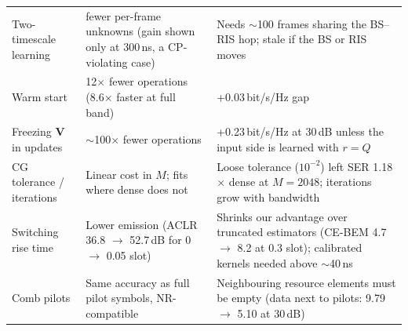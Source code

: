 \begin{table}[!htbp]
{\begin{tabular}{p{3.6cm}p{6.2cm}p{6.6cm}}
Two-timescale learning & fewer per-frame unknowns (gain shown only at 300\,ns, a CP-violating case) & Needs $\sim$100 frames sharing the BS--RIS hop; stale if the BS or RIS moves \\
Warm start & 12$\times$ fewer operations (8.6$\times$ faster at full band) & +0.03\,bit/s/Hz gap \\
Freezing $\bm V$ in updates & $\sim$100$\times$ fewer operations & +0.23\,bit/s/Hz at 30\,dB unless the input side is learned with $r=Q$ \\
CG tolerance / iterations & Linear cost in $M$; fits where dense does not & Loose tolerance ($10^{-2}$) left SER 1.18$\times$ dense at $M=2048$; iterations grow with bandwidth \\
Switching rise time & Lower emission (ACLR 36.8 $\to$ 52.7\,dB for 0 $\to$ 0.05 slot) & Shrinks our advantage over truncated estimators (CE-BEM 4.7 $\to$ 8.2 at 0.3 slot); calibrated kernels needed above $\sim$40\,ns \\
Comb pilots & Same accuracy as full pilot symbols, NR-compatible & Neighbouring resource elements must be empty (data next to pilots: 9.79 $\to$ 5.10 at 30\,dB) \\\bottomrule
\end{tabular}}
\end{table}

